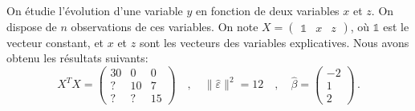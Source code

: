 \documentclass{../headers/td_upc}
\providecommand{\1}{\mathds{1}}
\begin{document}
	\cor{\newpage}

	 On étudie l'évolution d'une variable $y$ en fonction de deux variables $x$ et $z$.
	On dispose de $n$ observations de ces variables.
	On note $X=\begin{pmatrix}\1 & x & z\end{pmatrix}$,
	où $\1$ est le vecteur constant, et $x$ et $z$ sont les vecteurs des variables explicatives.
	Nous avons obtenu les résultats suivants:
			\[
			X^T X=\begin{pmatrix}
				30 & 0 & 0 \\
				? & 10 & 7 \\
				? & ? & 15
			\end{pmatrix}
			\quad , \quad
			\|\hat{\varepsilon}\|^{2} = 12
				\quad , \quad
			\hat{\beta} = \begin{pmatrix} -2 \\ 1 \\ 2 \end{pmatrix}\,.
			\]
\end{document}

